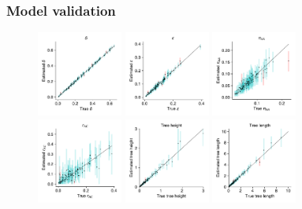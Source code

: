\documentclass[10pt,letterpaper,table]{article}
\begin{document}
\subsubsection*{Model validation}
\begin{figure}[!h]
    \centering
    \includegraphics[width=0.25\textwidth]{manuscript/figs/gt16_EM_delta.pdf}
    \includegraphics[width=0.25\textwidth]{manuscript/figs/gt16_EM_epsilon.pdf}
    \includegraphics[width=0.25\textwidth]{manuscript/figs/gt16_EM_pi_0.pdf}
    \includegraphics[width=0.25\textwidth]{manuscript/figs/gt16_EM_rates_ac.pdf}
    \includegraphics[width=0.25\textwidth]{manuscript/figs/gt16_EM_treeheight.pdf}
    \includegraphics[width=0.25\textwidth]{manuscript/figs/gt16_EM_treelength.pdf}

\end{figure}
\end{document}
